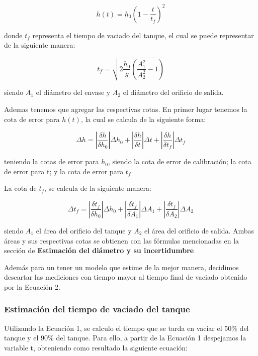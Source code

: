 \documentclass{article}
\begin{document}
\begin{equation}
    {h(t) = h_0 (1 -\frac{t}{t_f})^2}
    \tag{Ecuación 1}
\end{equation}

donde $t_f$ representa el tiempo de vaciado del tanque, el cual se puede representar de la siguiente manera:

\begin{equation}
    {t_f = \sqrt {2\frac{h_0}{g}(\frac{A_1^2}{A_2^2}-1)}}
    \tag{Ecuación 2}
\end{equation}

siendo $A_1$ el diámetro del envase y $A_2$ el diámetro del orificio de salida.

Ademas tenemos que agregar las respectivas cotas. En primer lugar tenemos la cota de error para $h(t)$, la cual se calcula de la siguiente forma:

\begin{equation}
    {\Delta h = \left|\frac{\delta h}{\delta h_0}\right|\Delta h_0 + \left|\frac{\delta h}{\delta t}\right|\Delta t + \left|\frac{\delta h}{\delta t_f}\right|\Delta t_f} \tag {Ecuación 3}
\end{equation}

teniendo la cotas de error para $h_0$, siendo la cota de error de calibración; la cota de error para t; y la cota de error para $t_f$

La cota de $t_f$, se calcula de la siguiente manera:

\begin{equation}
    {\Delta t_f = \left|\frac{\delta t_f}{\delta h_0}\right|\Delta h_0 + \left|\frac{\delta t_f}{\delta A_1}\right|\Delta A_1 + \left|\frac{\delta t_f}{\delta A_2}\right|\Delta A_2} \tag {Ecuación 4} 
\end{equation}

siendo $A_1$ el área del orificio del tanque y $A_2$ el área del orificio de salida. Ambas áreas y sus respectivas cotas se obtienen con las fórmulas mencionadas en la sección de \textbf{Estimación del diámetro y su incertidumbre}

Además para un tener un modelo que estime de la mejor manera, decidimos descartar las mediciones con tiempo mayor al tiempo final de vaciado obtenido por la Ecuación 2.

\subsubsection{Estimación del tiempo de vaciado del tanque}
Utilizando la Ecuación 1, se calculo el tiempo que se tarda en vaciar el $50\%$ del tanque y el $90\%$ del tanque. 
Para ello, a partir de la Ecuación 1 despejamos la variable t, obteniendo como resultado la siguiente ecuación:
\end{document}
